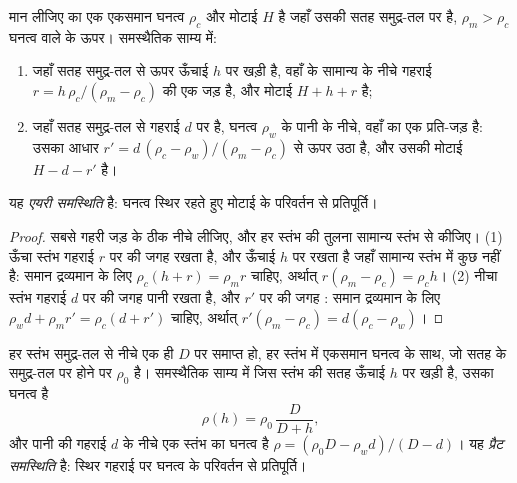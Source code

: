 \begin{proposition}\label{prop:b1:isostasy-gravity:airy}
मान लीजिए  का एक एकसमान घनत्व $\rho_c$ और मोटाई $H$ है जहाँ उसकी सतह समुद्र-तल पर है, $\rho_m > \rho_c$ घनत्व वाले  के ऊपर। समस्थैतिक साम्य में:
\begin{enumerate}
  \item जहाँ सतह समुद्र-तल से ऊपर ऊँचाई $h$ पर खड़ी है, वहाँ  के सामान्य  के नीचे गहराई $r = h\,\rho_c/(\rho_m - \rho_c)$ की एक जड़ है, और मोटाई $H + h + r$ है;
  \item जहाँ सतह समुद्र-तल से गहराई $d$ पर है, घनत्व $\rho_w$ के पानी के नीचे, वहाँ  का एक प्रति-जड़ है: उसका आधार $r' = d\,(\rho_c - \rho_w)/(\rho_m - \rho_c)$ से ऊपर उठा है, और उसकी मोटाई $H - d - r'$ है।
\end{enumerate}
यह \emph{एयरी समस्थिति} है: घनत्व स्थिर रहते हुए मोटाई के परिवर्तन से प्रतिपूर्ति।
\end{proposition}

\begin{proof}
सबसे गहरी जड़ के ठीक नीचे  लीजिए, और हर स्तंभ की तुलना सामान्य स्तंभ से कीजिए। (1) ऊँचा स्तंभ गहराई $r$ पर  की जगह  रखता है, और ऊँचाई $h$ पर  रखता है जहाँ सामान्य स्तंभ में कुछ नहीं है: समान द्रव्यमान के लिए $\rho_c(h + r) = \rho_m r$ चाहिए, अर्थात् $r(\rho_m - \rho_c) = \rho_c h$। (2) नीचा स्तंभ गहराई $d$ पर  की जगह पानी रखता है, और $r'$ पर  की जगह : समान द्रव्यमान के लिए $\rho_w d + \rho_m r' = \rho_c(d + r')$ चाहिए, अर्थात् $r'(\rho_m - \rho_c) =
d(\rho_c - \rho_w)$।
\end{proof}

\begin{proposition}[प्रैट समस्थिति]\label{prop:b1:isostasy-gravity:pratt}
हर स्तंभ समुद्र-तल से नीचे एक ही  $D$ पर समाप्त हो, हर स्तंभ में एकसमान घनत्व के साथ, जो सतह के समुद्र-तल पर होने पर $\rho_0$ है। समस्थैतिक साम्य में जिस स्तंभ की सतह ऊँचाई $h$ पर खड़ी है, उसका घनत्व है
\[
  \rho(h) = \rho_0\,\frac{D}{D + h},
\]
और पानी की गहराई $d$ के नीचे एक स्तंभ का घनत्व है $\rho = (\rho_0 D - \rho_w d)/(D - d)$। यह \emph{प्रैट समस्थिति} है: स्थिर गहराई पर घनत्व के परिवर्तन से प्रतिपूर्ति।
\end{proposition}

